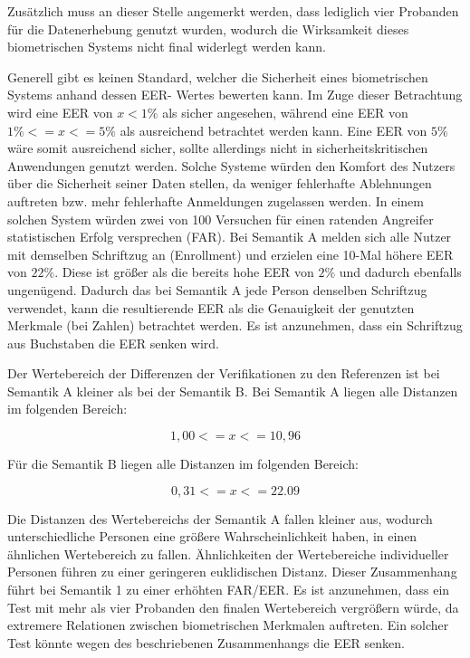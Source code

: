 \documentclass{article}
\begin{document}
Zusätzlich muss an dieser Stelle angemerkt werden, dass lediglich vier Probanden für die Datenerhebung 
genutzt wurden, wodurch die Wirksamkeit dieses biometrischen Systems nicht final widerlegt werden kann.

Generell gibt es keinen Standard, welcher die Sicherheit eines biometrischen Systems anhand dessen EER-
Wertes bewerten kann. Im Zuge dieser Betrachtung wird eine EER von $x < 1\%$ als sicher angesehen, während 
eine EER von $1\% <= x <= 5\%$ als ausreichend betrachtet werden kann. Eine EER von $5\%$ wäre somit 
ausreichend sicher, sollte allerdings nicht in sicherheitskritischen Anwendungen genutzt werden. Solche 
Systeme würden den Komfort des Nutzers über die Sicherheit seiner Daten stellen, da weniger fehlerhafte 
Ablehnungen auftreten bzw. mehr fehlerhafte Anmeldungen zugelassen werden. In einem solchen System würden 
zwei von 100 Versuchen für einen ratenden Angreifer statistischen Erfolg versprechen (FAR). Bei Semantik A 
melden sich alle Nutzer mit demselben Schriftzug an (Enrollment) und erzielen eine 10-Mal höhere EER von 
$22\%$. Diese ist größer als die bereits hohe EER von $2\%$ und dadurch ebenfalls ungenügend. Dadurch das 
bei Semantik A jede Person denselben Schriftzug verwendet, kann die resultierende EER als die Genauigkeit 
der genutzten Merkmale (bei Zahlen) betrachtet werden. Es ist anzunehmen, dass ein Schriftzug aus 
Buchstaben die EER senken wird.

Der Wertebereich der Differenzen der Verifikationen zu den Referenzen ist bei Semantik A kleiner als bei 
der Semantik B. Bei Semantik A liegen alle Distanzen im folgenden Bereich:

$$1,00 <= x <= 10,96$$

Für die Semantik B liegen alle Distanzen im folgenden Bereich:

$$0,31 <= x <= 22.09$$

Die Distanzen des Wertebereichs der Semantik A fallen kleiner aus, wodurch unterschiedliche Personen eine 
größere Wahrscheinlichkeit haben, in einen ähnlichen Wertebereich zu fallen. Ähnlichkeiten der 
Wertebereiche individueller Personen führen zu einer geringeren euklidischen Distanz. Dieser Zusammenhang 
führt bei Semantik 1 zu einer erhöhten FAR/EER. Es ist anzunehmen, dass ein Test mit mehr als vier 
Probanden den finalen Wertebereich vergrößern würde, da extremere Relationen zwischen biometrischen 
Merkmalen auftreten. Ein solcher Test könnte wegen des beschriebenen Zusammenhangs die EER senken.
\end{document}
